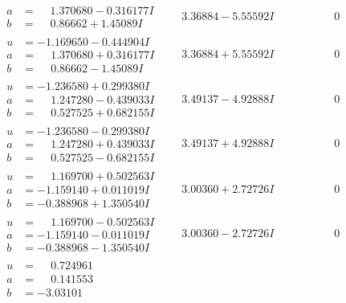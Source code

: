 \documentclass[1p]{elsarticle_modified}
\theoremstyle{definition}
\begin{document}
$$\begin{array}{c|c|c}
\begin{aligned}
a &= \phantom{-}1.370680 - 0.316177 I \\
b &= \phantom{-}0.86662 + 1.45089 I\end{aligned}
 & \phantom{-}3.36884 - 5.55592 I & \phantom{-0.000000 } 0 \\ \hline\begin{aligned}
u &= -1.169650 - 0.444904 I \\
a &= \phantom{-}1.370680 + 0.316177 I \\
b &= \phantom{-}0.86662 - 1.45089 I\end{aligned}
 & \phantom{-}3.36884 + 5.55592 I & \phantom{-0.000000 } 0 \\ \hline\begin{aligned}
u &= -1.236580 + 0.299380 I \\
a &= \phantom{-}1.247280 - 0.439033 I \\
b &= \phantom{-}0.527525 + 0.682155 I\end{aligned}
 & \phantom{-}3.49137 - 4.92888 I & \phantom{-0.000000 } 0 \\ \hline\begin{aligned}
u &= -1.236580 - 0.299380 I \\
a &= \phantom{-}1.247280 + 0.439033 I \\
b &= \phantom{-}0.527525 - 0.682155 I\end{aligned}
 & \phantom{-}3.49137 + 4.92888 I & \phantom{-0.000000 } 0 \\ \hline\begin{aligned}
u &= \phantom{-}1.169700 + 0.502563 I \\
a &= -1.159140 + 0.011019 I \\
b &= -0.388968 + 1.350540 I\end{aligned}
 & \phantom{-}3.00360 + 2.72726 I & \phantom{-0.000000 } 0 \\ \hline\begin{aligned}
u &= \phantom{-}1.169700 - 0.502563 I \\
a &= -1.159140 - 0.011019 I \\
b &= -0.388968 - 1.350540 I\end{aligned}
 & \phantom{-}3.00360 - 2.72726 I & \phantom{-0.000000 } 0 \\ \hline\begin{aligned}
u &= \phantom{-}0.724961\phantom{ +0.000000I} \\
a &= \phantom{-}0.141553\phantom{ +0.000000I} \\
b &= -3.03101\phantom{ +0.000000I}\end{aligned}

\end{array}$$
\end{document}
